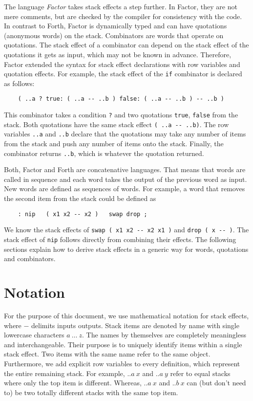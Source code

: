 \documentclass[a4paper]{hitec}
\begin{document}
The language \textit{Factor} takes stack effects a step further. In Factor, they are not
mere comments, but are checked by the compiler for consistency with the code.
In contrast to Forth, Factor is dynamically typed and can have quotations
(anonymous words) on the stack. Combinators are words that operate on 
quotations. The stack effect of a combinator can depend on the stack effect of
the quotations it gets as input, which may not be known in advance. Therefore,
Factor extended the syntax for stack effect declarations with row variables and
quotation effects. For example, the stack effect of the \verb|if| combinator is
declared as follows:
\begin{verbatim}
	( ..a ? true: ( ..a -- ..b ) false: ( ..a -- ..b ) -- ..b )
\end{verbatim}
This combinator takes a condition \verb|?| and two quotations \verb|true|, 
\verb|false| from the stack. Both quotations have the same stack effect
\verb|( ..a -- ..b)|. The row variables \verb|..a| and \verb|..b| declare that
the quotations may take any number of items from the stack and push any number
of items onto the stack. Finally, the combinator returns \verb|..b|, which is
whatever the quotation returned.

Both, Factor and Forth are concatenative languages. That means that words are
called in sequence and each word takes the output of the previous word as input.
New words are defined as sequences of words. For example, a word that removes
the second item from the stack could be defined as
\begin{verbatim}
	: nip   ( x1 x2 -- x2 )   swap drop ;
\end{verbatim}
We know the stack effects of \verb|swap ( x1 x2 -- x2 x1 )| and 
\verb|drop ( x -- )|. The stack effect of \verb|nip| follows directly from
combining their effects. The following sections explain how to derive stack
effects in a generic way for words, quotations and combinators.

\section{Notation}

For the purpose of this document, we use mathematical notation for stack
effects, where $-$ delimits inputs outputs. Stack items are denoted by name
with single lowercase characters $a\ \dots\ z$. The names by themselves are
completely meaningless and interchangeable. Their purpose is to uniquely
identify items within a single stack effect. Two items with the same name refer
to the same object.
Furthermore, we add explicit row variables to every definition, which represent 
the entire remaining stack. For example, $..a\ x$ and $..a\ y$ refer to equal
stacks where only the top item is different. Whereas, $..a\ x$ and $..b\ x$ can 
(but don't need to) be two totally different stacks with the same top item.
\end{document}

